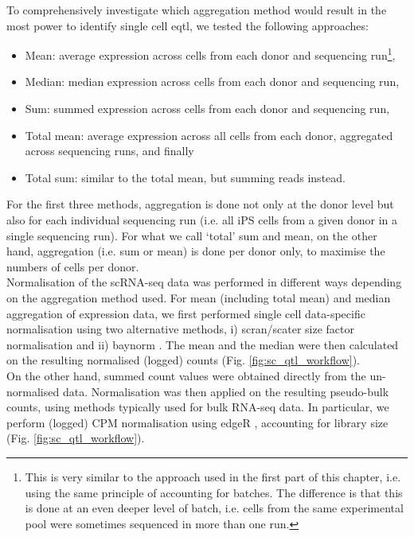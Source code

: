 To comprehensively investigate which aggregation method would result in the most power to identify single cell \gls{eqtl}, we tested the following approaches:

\begin{itemize}
    \item Mean: average expression across cells from each donor and sequencing run\footnote{This is very similar to the approach used in the first part of this chapter, i.e. using the same principle of accounting for batches.
    The difference is that this is done at an even deeper level of batch, i.e. cells from the same experimental pool were sometimes sequenced in more than one run.},
    \item Median: median expression across cells from each donor and sequencing run,
    \item Sum: summed expression across cells from each donor and sequencing run,
    \item Total mean: average expression across all cells from each donor, aggregated across sequencing runs, and finally
    \item Total sum: similar to the total mean, but summing reads instead.
\end{itemize}

\newpage

For the first three methods, aggregation is done not only at the donor level but also for each individual sequencing run (i.e. all iPS cells from a given donor in a single sequencing run).
For what we call `total' sum and mean, on the other hand, aggregation (i.e. sum or mean) is done per donor only, to maximise the numbers of cells per donor.\\

Normalisation of the scRNA-seq data was performed in different ways depending on the aggregation method used.
For mean (including total mean) and median aggregation of expression data, we first performed single cell data-specific normalisation using two alternative methods, i) scran/scater \cite{mccarthy2017scater} size factor normalisation and ii) baynorm \cite{tang2020baynorm}.
The mean and the median were then calculated on the resulting normalised (logged) counts (Fig. \ref{fig:sc_qtl_workflow}). \\

On the other hand, summed count values were obtained directly from the un-normalised data.
Normalisation was then applied on the resulting pseudo-bulk counts, using methods typically used for bulk RNA-seq data.
In particular, we perform (logged) CPM normalisation using edgeR \cite{robinson2010edger}, accounting for library size (Fig. \ref{fig:sc_qtl_workflow}).\\

